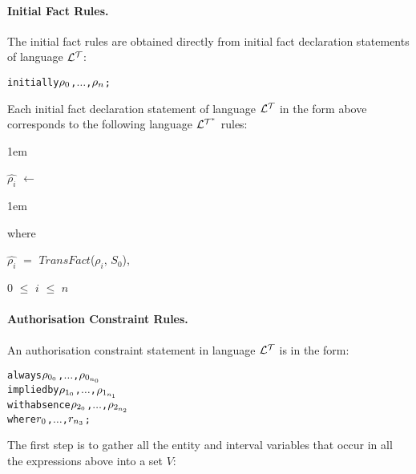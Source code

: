 \documentclass[11pt]{report}
\newenvironment{vverbatim}
{
  \begin{alltt}
}
{
    \vspace{-\baselineskip}
  \end{alltt}
}
\newenvironment{vquote}
{
  \begin{list}{}{\leftmargin 1em}\item[]
}
{
  \end{list}
}
\begin{document}
          \paragraph
            {\bf Initial Fact Rules.}

            The initial fact rules are obtained directly from initial fact
            declaration statements of language ${\cal L^T}$:

            \begin{vverbatim}
  initially \(\rho\sb{0}\), \(\ldots\), \(\rho\sb{n}\);
            \end{vverbatim}

            Each initial fact declaration statement of language ${\cal L^T}$
            in the form above corresponds to the following language
            ${\cal L^{T^*}}$ rules:

            \begin{vquote}
              $\hat{\rho_i}$ $\leftarrow$
            \end{vquote}

            \begin{vquote}
              where

              \hspace{1em}
              $\hat{\rho_i}$ $=$ $TransFact$($\rho_i$, $S_0$),

              \hspace{1em}
              $0$ $\leq$ $i$ $\leq$ $n$
            \end{vquote}

          \paragraph
            {\bf Authorisation Constraint Rules.}

            An authorisation constraint statement in language ${\cal L^T}$
            is in the form:

            \begin{vverbatim}
  always \(\rho\sb{0\sb{0}}\), \(\ldots\), \(\rho\sb{0\sb{n\sb{0}}}\)
    implied by \(\rho\sb{1\sb{0}}\), \(\ldots\), \(\rho\sb{1\sb{n\sb{1}}}\)
    with absence \(\rho\sb{2\sb{0}}\), \(\ldots\), \(\rho\sb{2\sb{n\sb{2}}}\)
    where \(r\sb{0}\), \(\ldots\), \(r\sb{n\sb{3}}\);
            \end{vverbatim}

            The first step is to gather all the entity and interval
            variables that occur in all the expressions above into a set $V$:
\end{document}
